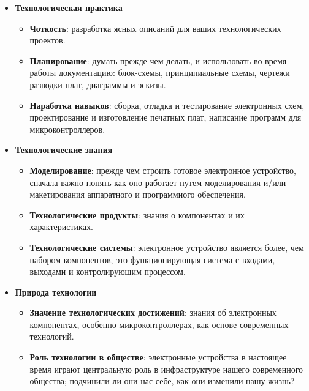 \secdown


\begin{itemize}

\item \textbf{Технологическая практика}

\begin{itemize}

\item\textbf{Чоткость}: разработка ясных описаний для ваших технологических
проектов.

\item\textbf{Планирование}: думать прежде чем делать, и использовать во время
работы документацию: блок-схемы, принципиальные схемы, чертежи разводки плат,
диаграммы и эскизы.

\item\textbf{Наработка навыков}: сборка, отладка и тестирование электронных
схем, проектирование и изготовление печатных плат, написание программ для
микроконтроллеров.

\end{itemize}

\item \textbf{Технологические знания}

\begin{itemize}

\item\textbf{Моделирование}: прежде чем строить готовое электронное устройство,
сначала важно понять как оно работает путем моделирования и/или макетирования
аппаратного и программного обеспечения.

\item\textbf{Технологические продукты}: знания о компонентах и их
характеристиках.

\item\textbf{Технологические системы}: электронное устройство является более,
чем набором компонентов, это функционирующая система с входами, выходами и
контролирующим процессом.

\end{itemize}

\item \textbf{Природа технологии}

\begin{itemize}

\item\textbf{Значение технологических достижений}: знания об электронных
компонентах, особенно микроконтроллерах, как основе современных технологий.

\item\textbf{Роль технологии в обществе}: электронные устройства в настоящее
время играют центральную роль в инфраструктуре нашего современного общества;
подчинили ли они нас себе, как они изменили нашу жизнь?

\end{itemize}

\end{itemize}


